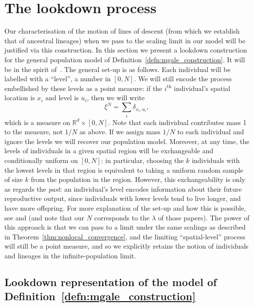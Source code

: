\documentclass[12pt]{article}
\newcommand{\IR}{\mathbb R}
\newcommand{\lp}{\xi}              %
\numberwithin{equation}{section}
\begin{document}
\section{The lookdown process}
    \label{sec:lookdown}

Our characterisation of the motion of lines of descent (from which we establish
that of ancestral lineages) when we pass
to the scaling limit in our model will be justified via this construction.
In this section 
we present a lookdown construction for the general population model 
of Definition~\ref{defn:mgale_construction}. It will be
in the spirit of~\cite{kurtz/rodrigues:2011}. 
The general set-up is as follows.
Each individual will be labelled with a ``level'', a number in $[0, N]$.
We will still encode the process embellished by these levels
as a point measure:
if the $i^\mathrm{th}$ individual's spatial location is $x_i$
and level is $u_i$, then we will write
\[
    \lp^N = \sum_i \delta_{x_i, u_i} ,
\]
which is a measure on $\IR^d \times [0, N]$.
Note that each individual contributes mass 1 to the measure,
not $1/N$ as above. If we assign mass $1/N$ to each individual and 
ignore the levels we will recover our population model. 
Moreover, at any time, the levels of 
individuals in a given spatial region 
will be exchangeable and conditionally uniform on $[0, N]$:
in particular, choosing the $k$ individuals with the lowest levels 
in that region
is equivalent to taking a uniform random sample of size $k$ 
from the population in the region.
However, this exchangeability is only as regards the \emph{past}:
an individual's level encodes information about their future reproductive output,
since individuals with lower levels tend to live longer, and have more offspring.
For more explanation of the set-up and how this is possible,
see \citet{kurtz/rodrigues:2011} and \citet{etheridge/kurtz:2019} 
(and note that our $N$ corresponds to the $\lambda$ of those papers).
The power of this approach is that we can pass to a limit under the
same scalings as described in Theorem~\ref{thm:nonlocal_convergence}, 
and 
the limiting ``spatial-level'' process will still be a point measure,
and so we explicitly retains the notion of individuals and lineages
in the infinite-population limit.


\subsection{Lookdown representation of the model of 
Definition~\ref{defn:mgale_construction}}
\label{sec:lookdown_defn}
\end{document}
